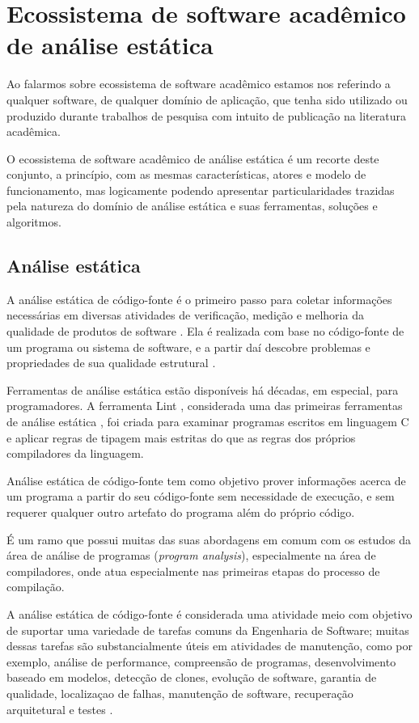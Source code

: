 \section{Ecossistema de software acadêmico de análise estática} \label{analise-estatica}

Ao falarmos sobre ecossistema de software acadêmico estamos nos referindo a
qualquer software, de qualquer domínio de aplicação, que tenha sido utilizado
ou produzido durante trabalhos de pesquisa com intuito de publicação na
literatura acadêmica.

O ecossistema de software acadêmico de análise estática é um recorte deste
conjunto, a princípio, com as mesmas características, atores e modelo de
funcionamento, mas logicamente podendo apresentar particularidades trazidas
pela natureza do domínio de análise estática e suas ferramentas, soluções e
algoritmos.

\subsection{Análise estática}

A análise estática de código-fonte é o primeiro passo para coletar informações
necessárias em diversas atividades de verificação, medição e melhoria da
qualidade de produtos de software \cite{cruz2009code, kirkov2010source}. Ela é
realizada com base no código-fonte de um programa ou sistema de software, e a
partir daí descobre problemas e propriedades de sua qualidade estrutural
\cite{chess2007secure}.

Ferramentas de análise estática estão disponíveis há décadas, em especial,
para programadores. A ferramenta Lint \cite{johnson1978lint}, considerada uma das
primeiras ferramentas de análise estática \cite{gosain2015static}, foi criada para
examinar programas escritos em linguagem C e aplicar regras de tipagem mais
estritas do que as regras dos próprios compiladores da linguagem.

Análise estática de código-fonte tem como objetivo prover
informações acerca de um programa a partir do seu código-fonte sem
necessidade de execução, e sem requerer qualquer outro artefato do programa
além do próprio código.

É um ramo que possui muitas das suas abordagens em comum com os estudos da
área de análise de programas ({\it program analysis}), especialmente na área de
compiladores, onde atua especialmente nas primeiras etapas do processo de compilação.

A análise estática de código-fonte é considerada uma atividade meio com
objetivo de suportar uma variedade de tarefas comuns da Engenharia de
Software; muitas dessas tarefas são substancialmente úteis em atividades de
manutenção, como por exemplo,
análise de performance,
compreensão de programas,
desenvolvimento baseado em modelos,
detecção de clones,
evolução de software,
garantia de qualidade,
localizaçao de falhas,
manutenção de software,
recuperação arquitetural e
testes \cite{binkley2007source}.

